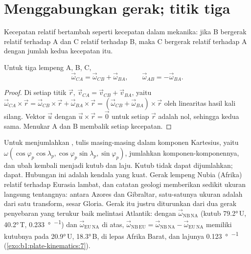 \section{Menggabungkan gerak; titik tiga}

Kecepatan relatif bertambah seperti kecepatan dalam mekanika: jika B bergerak relatif terhadap A dan C relatif terhadap B, maka C bergerak relatif terhadap A dengan jumlah kedua kecepatan itu.

\begin{proposition}\label{prop:b1:plate-kinematics:addition}
Untuk tiga lempeng A, B, C,
\[
  \vec\omega_{CA} = \vec\omega_{CB} + \vec\omega_{BA}, \qquad
  \vec\omega_{AB} = -\vec\omega_{BA}.
\]
\end{proposition}

\begin{proof}
Di setiap titik $\vec r$, $\vec v_{CA} = \vec v_{CB} + \vec v_{BA}$, yaitu
$\vec\omega_{CA}\times\vec r = \vec\omega_{CB}\times\vec r +
\vec\omega_{BA}\times\vec r = (\vec\omega_{CB} + \vec\omega_{BA})\times\vec r$
oleh linearitas hasil kali silang. Vektor $\vec u$ dengan
$\vec u\times\vec r = \vec 0$ untuk setiap $\vec r$ adalah nol, sehingga kedua 
sama. Menukar A dan B membalik setiap kecepatan.
\end{proof}

Untuk menjumlahkan , tulis masing-masing dalam komponen Kartesius, yaitu $\omega(\cos\varphi_p
\cos\lambda_p, \cos\varphi_p\sin\lambda_p, \sin\varphi_p)$, jumlahkan komponen-komponennya,
dan ubah kembali menjadi kutub dan laju. Kutub tidak dapat dijumlahkan;  dapat. Hubungan ini adalah kendala yang kuat. Gerak lempeng Nubia
(Afrika) relatif terhadap Eurasia lambat, dan catatan geologi memberikan sedikit ukuran
langsung tentangnya: antara Azores dan Gibraltar, satu-satunya ukuran adalah  dari satu transform, sesar Gloria. Gerak itu justru diturunkan dari
dua gerak penyebaran yang terukur baik melintasi Atlantik: dengan $\vec\omega_{\mathrm{NB\,NA}}$ (kutub
\ang{79.2}\,U, \ang{40.2}\,T, \qty{0.233}{\degree\per\Ma}) dan
$\vec\omega_{\mathrm{EU\,NA}}$ di atas, $\vec\omega_{\mathrm{NB\,EU}} =
\vec\omega_{\mathrm{NB\,NA}} - \vec\omega_{\mathrm{EU\,NA}}$ memiliki kutubnya pada
\ang{20.9}\,U, \ang{18.3}\,B, di lepas Afrika Barat, dan lajunya
\qty{0.123}{\degree\per\Ma} (\cref{exo:b1:plate-kinematics:7}).

